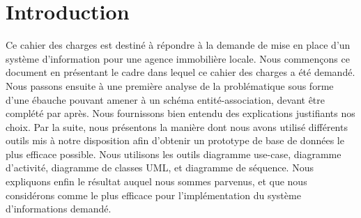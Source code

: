 \section{Introduction}
Ce cahier des charges est destiné à répondre à la demande de mise en place d'un système d'information pour une agence immobilière locale. Nous commençons ce document en présentant le cadre dans lequel ce cahier des charges a été demandé. Nous passons ensuite à une première analyse de la problématique sous forme d'une ébauche pouvant amener à un schéma entité-association, devant être complété par après. Nous fournissons bien entendu des explications justifiants nos choix. Par la suite, nous présentons la manière dont nous avons utilisé différents outils mis à notre disposition afin d'obtenir un prototype de base de données le plus efficace possible. Nous utilisons les outils diagramme use-case, diagramme d'activité, diagramme de classes UML, et diagramme de séquence. Nous expliquons enfin le résultat auquel nous sommes parvenus, et que nous considérons comme le plus efficace pour l'implémentation du système d'informations demandé.